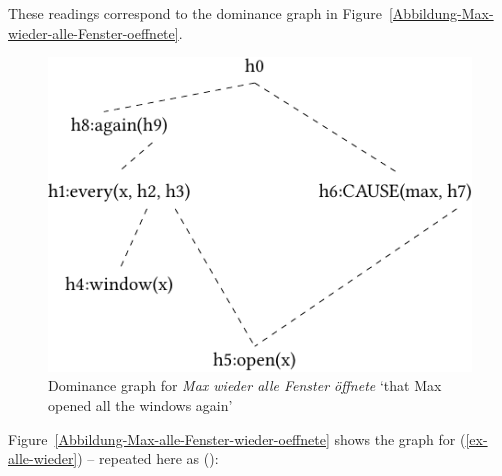 \noindent
These readings correspond to the dominance graph in Figure~\vref{Abbildung-Max-wieder-alle-Fenster-oeffnete}.
\begin{figure}
\centering

\includegraphics{Figures/mrs-max-wieder-alle-fenster-oeffnete-cropped.pdf}
\caption{Dominance graph for \emph{Max wieder alle Fenster öffnete} `that Max opened all the
  windows again'\label{Abbildung-Max-wieder-alle-Fenster-oeffnete}}
\end{figure}%
Figure~\vref{Abbildung-Max-alle-Fenster-wieder-oeffnete} shows the graph for (\ref{ex-alle-wieder})
-- repeated here as ():
\ea
\label{ex-alle-wieder-zwei}
